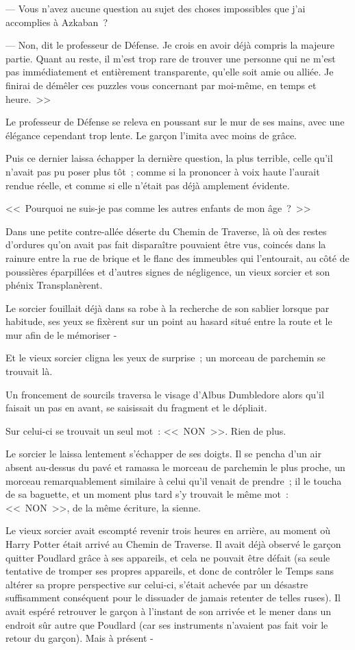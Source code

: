 --- Vous n'avez aucune question au sujet des choses impossibles que j'ai accomplies à Azkaban~?

--- Non, dit le professeur de Défense. Je crois en avoir déjà compris la majeure partie. Quant au reste, il m'est trop rare de trouver une personne qui ne m'est pas immédiatement et entièrement transparente, qu'elle soit amie ou alliée. Je finirai de démêler ces puzzles vous concernant par moi-même, en temps et heure.~>>

Le professeur de Défense se releva en poussant sur le mur de ses mains, avec une élégance cependant trop lente. Le garçon l'imita avec moins de grâce.

Puis ce dernier laissa échapper la dernière question, la plus terrible, celle qu'il n'avait pas pu poser plus tôt~; comme si la prononcer à voix haute l'aurait rendue réelle, et comme si elle n'était pas déjà amplement évidente.

<<~Pourquoi ne suis-je pas comme les autres enfants de mon âge~?~>>

\later

Dans une petite contre-allée déserte du Chemin de Traverse, là où des restes d'ordures qu'on avait pas fait disparaître pouvaient être vus, coincés dans la rainure entre la rue de brique et le flanc des immeubles qui l'entourait, au côté de poussières éparpillées et d'autres signes de négligence, un vieux sorcier et son phénix Transplanèrent.

Le sorcier fouillait déjà dans sa robe à la recherche de son sablier lorsque par habitude, ses yeux se fixèrent sur un point au hasard situé entre la route et le mur afin de le mémoriser -

Et le vieux sorcier cligna les yeux de surprise~; un morceau de parchemin se trouvait là.

Un froncement de sourcils traversa le visage d'Albus Dumbledore alors qu'il faisait un pas en avant, se saisissait du fragment et le dépliait.

Sur celui-ci se trouvait un seul mot~: <<~NON~>>. Rien de plus.

Le sorcier le laissa lentement s'échapper de ses doigts. Il se pencha d'un air absent au-dessus du pavé et ramassa le morceau de parchemin le plus proche, un morceau remarquablement similaire à celui qu'il venait de prendre~; il le toucha de sa baguette, et un moment plus tard s'y trouvait le même mot~: <<~NON~>>, de la même écriture, la sienne.

Le vieux sorcier avait escompté revenir trois heures en arrière, au moment où Harry Potter était arrivé au Chemin de Traverse. Il avait déjà observé le garçon quitter Poudlard grâce à ses appareils, et cela ne pouvait être défait (sa seule tentative de tromper ses propres appareils, et donc de contrôler le Temps sans altérer sa propre perspective sur celui-ci, s'était achevée par un désastre suffisamment conséquent pour le dissuader de jamais retenter de telles ruses). Il avait espéré retrouver le garçon à l'instant de son arrivée et le mener dans un endroit sûr autre que Poudlard (car ses instruments n'avaient pas fait voir le retour du garçon). Mais à présent -

